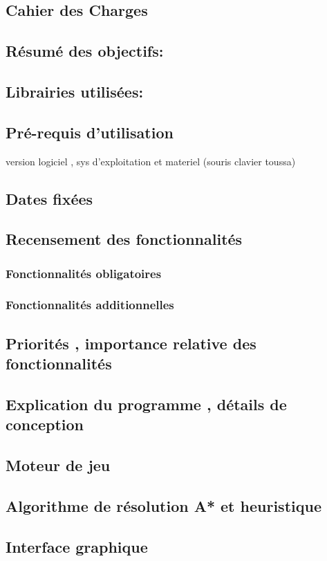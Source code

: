 \documentclass{article}
\begin{document}
\newpage
\begin{center}
	\section{Cahier des Charges}
	
		\subsection{Résumé des objectifs:}
		\subsection{Librairies utilisées:}
		\subsection{Pré-requis d'utilisation}version logiciel , sys d'exploitation et materiel (souris clavier toussa)
		\subsection{Dates fixées}
		\subsection{Recensement des fonctionnalités}
			\subsubsection{Fonctionnalités obligatoires}
			\subsubsection{Fonctionnalités additionnelles}
		\subsection{Priorités , importance relative des fonctionnalités}
\end{center}

\newpage
\begin{center}
	\section{Explication du programme , détails de conception}
		\subsection{Moteur de jeu}
		\subsection{Algorithme de résolution A* et heuristique}
		\subsection{Interface graphique}
\end{center}
\end{document}
